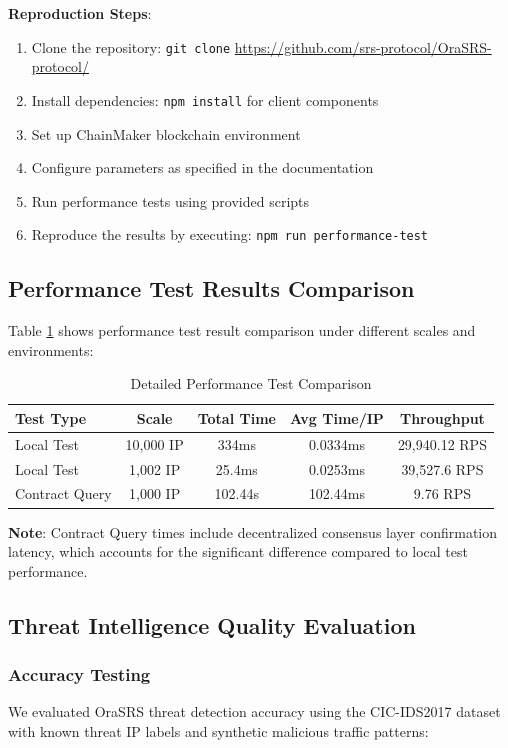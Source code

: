 \documentclass[12pt]{article}
\begin{document}
\textbf{Reproduction Steps}:
\begin{enumerate}
\item Clone the repository: \texttt{git clone} \url{https://github.com/srs-protocol/OraSRS-protocol/}
\item Install dependencies: \texttt{npm install} for client components
\item Set up ChainMaker blockchain environment
\item Configure parameters as specified in the documentation
\item Run performance tests using provided scripts
\item Reproduce the results by executing: \texttt{npm run performance-test}
\end{enumerate}

\subsection{Performance Test Results Comparison}
Table \ref{tab:detailed_performance_comparison} shows performance test result comparison under different scales and environments:

\begin{table}[H]
\centering
\begin{tabular}{@{}lcccc@{}}
\toprule
\textbf{Test Type} & \textbf{Scale} & \textbf{Total Time} & \textbf{Avg Time/IP} & \textbf{Throughput} \\
\midrule
Local Test & 10,000 IP & 334ms & 0.0334ms & 29,940.12 RPS \\
Local Test & 1,002 IP & 25.4ms & 0.0253ms & 39,527.6 RPS \\
Contract Query & 1,000 IP & 102.44s & 102.44ms & 9.76 RPS \\
\bottomrule
\end{tabular}
\caption{Detailed Performance Test Comparison}
\label{tab:detailed_performance_comparison}
\end{table}

\noindent \textbf{Note}: Contract Query times include decentralized consensus layer confirmation latency, which accounts for the significant difference compared to local test performance.

\subsection{Threat Intelligence Quality Evaluation}

\subsubsection{Accuracy Testing}
We evaluated OraSRS threat detection accuracy using the CIC-IDS2017 dataset with known threat IP labels and synthetic malicious traffic patterns:
\end{document}
